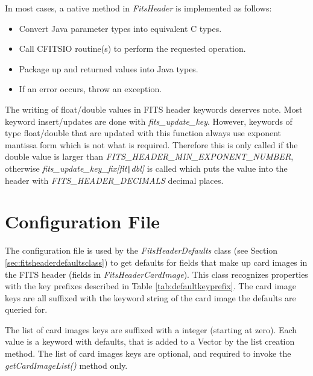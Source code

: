 \documentclass[10pt,a4paper]{article}
\begin{document}
In most cases, a native method in {\em FitsHeader} is implemented as follows:
\begin{itemize}
\item Convert Java parameter types into equivalent C types.
\item Call CFITSIO routine(s) to perform the requested operation.
\item Package up and returned values into Java types.
\item If an error occurs, throw an exception.
\end{itemize}

The writing of float/double values in FITS header keywords deserves note. Most keyword insert/updates are done
with {\em fits\_update\_key}. However, keywords of type float/double that are updated with this function
always use exponent mantissa form which is not what is required. Therefore this is only called if
the double value is larger than {\em FITS\_HEADER\_MIN\_EXPONENT\_NUMBER}, otherwise 
{\em fits\_update\_key\_fix[flt\verb'|'dbl]} is called which puts the value into the header with 
{\em FITS\_HEADER\_DECIMALS} decimal places.

\section{Configuration File}
\label{sec:configfile}
The configuration file is used by the {\em FitsHeaderDefaults} class (see Section \ref{sec:fitsheaderdefaultsclass}) 
to get defaults for fields that make up card images in the FITS header (fields in {\em FitsHeaderCardImage}).
This class recognizes properties with the key prefixes described in Table \ref{tab:defaultkeyprefix}.
The card image keys are all suffixed with the keyword string of the card image the defaults are queried for.

The list of card images keys are suffixed with a integer (starting at zero). Each value is a keyword with
defaults, that is added to a Vector by the list creation method. The list of card images keys are optional,
and required to invoke the {\em getCardImageList()} method only.
\end{document}
